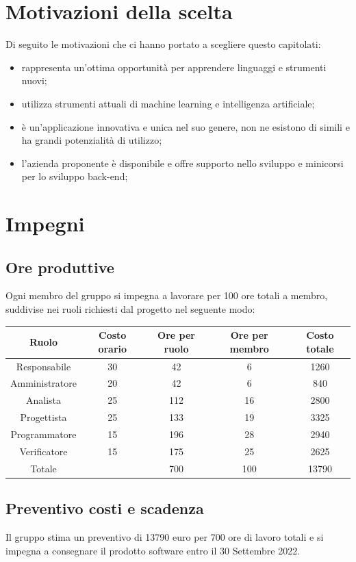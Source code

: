 \documentclass[12pt,a4paper]{article}
\begin{document}
\section{Motivazioni della scelta}
Di seguito le motivazioni che ci hanno portato a scegliere questo capitolati:
	\begin{itemize}
		\item rappresenta un'ottima opportunità per apprendere linguaggi e strumenti nuovi;
		\item utilizza strumenti attuali di machine learning e intelligenza artificiale;
		\item è un'applicazione innovativa e unica nel suo genere, non ne esistono di simili e ha grandi potenzialità di utilizzo;
		\item l'azienda proponente è disponibile e offre supporto nello sviluppo e minicorsi per lo sviluppo back-end;
	\end{itemize}
\section{Impegni}

	\subsection{Ore produttive}
	Ogni membro del gruppo si impegna a lavorare per 100 ore totali a membro, suddivise nei ruoli richiesti dal progetto nel seguente modo: 
		\begin{center}
			\begin{tabular}{||c | c | c | c | c||} 
			 \hline
			 Ruolo & Costo orario  & Ore per ruolo & Ore per membro & Costo totale \\ [0.5ex] 
			 \hline\hline
			 Responsabile & 30 & 42 & 6 & 1260 \\ 
			 \hline
			 Amministratore & 20 & 42 & 6 & 840 \\
			 \hline
			 Analista & 25 & 112 & 16 & 2800 \\
			 \hline
			 Progettista & 25 & 133 & 19 & 3325 \\
			 \hline
			 Programmatore & 15 & 196 & 28 & 2940 \\
			 \hline
			 Verificatore & 15 & 175 & 25 & 2625 \\
			 \hline\hline
			 Totale &  & 700 & 100 & 13790 \\
			 \hline
			\end{tabular}
		\end{center}

\subsection{Preventivo costi e scadenza}
Il gruppo stima un preventivo di 13790 euro per 700 ore di lavoro totali e si impegna a consegnare il prodotto software entro il 30 Settembre 2022.
\end{document}
